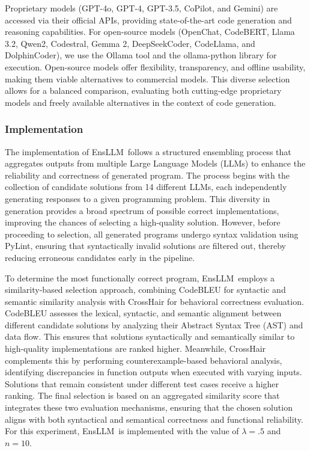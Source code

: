 \documentclass{article}
\newcommand{\tool}{EnsLLM}
\begin{document}
Proprietary models (GPT-4o, GPT-4, GPT-3.5, CoPilot, and Gemini) are accessed via their official APIs, providing state-of-the-art code generation and reasoning capabilities. For open-source models (OpenChat, CodeBERT, Llama 3.2, Qwen2, Codestral, Gemma 2, DeepSeekCoder, CodeLlama, and DolphinCoder), we use the Ollama tool and the ollama-python library for execution. Open-source models offer flexibility, transparency, and offline usability, making them viable alternatives to commercial models. This diverse selection allows for a balanced comparison, evaluating both cutting-edge proprietary models and freely available alternatives in the context of code generation.

\subsubsection{Implementation} 
\leavevmode\par
The implementation of \tool\ follows a structured ensembling process that aggregates outputs from multiple Large Language Models (LLMs) to enhance the reliability and correctness of generated program. The process begins with the collection of candidate solutions from 14 different LLMs, each independently generating responses to a given programming problem. This diversity in generation provides a broad spectrum of possible correct implementations, improving the chances of selecting a high-quality solution. However, before proceeding to selection, all generated programs undergo syntax validation using PyLint, ensuring that syntactically invalid solutions are filtered out, thereby reducing erroneous candidates early in the pipeline.

To determine the most functionally correct program, \tool\ employs a similarity-based selection approach, combining CodeBLEU for syntactic and semantic similarity analysis with CrossHair for behavioral correctness evaluation. CodeBLEU assesses the lexical, syntactic, and semantic alignment between different candidate solutions by analyzing their Abstract Syntax Tree (AST) and data flow. This ensures that solutions syntactically and semantically similar to high-quality implementations are ranked higher. Meanwhile, CrossHair complements this by performing counterexample-based behavioral analysis, identifying discrepancies in function outputs when executed with varying inputs. Solutions that remain consistent under different test cases receive a higher ranking. The final selection is based on an aggregated similarity score that integrates these two evaluation mechanisms, ensuring that the chosen solution aligns with both syntactical and semantical correctness and functional reliability. For this experiment, \tool\ is implemented with the value of $\lambda = .5$ and $n = 10$.
\end{document}
